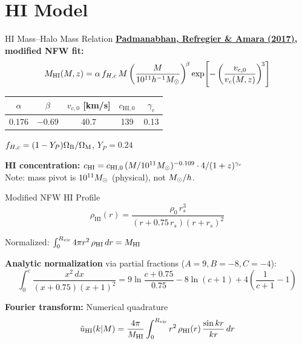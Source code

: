 \section{HI Model}

\begin{frame}{HI Mass--Halo Mass Relation}
\textbf{\href{https://arxiv.org/abs/1611.06235}{Padmanabhan, Refregier \& Amara (2017)}, modified NFW fit:}
\begin{equation}
M_{\mathrm{HI}}(M,z) = \alpha\,f_{H,c}\,M\left(\frac{M}{10^{11}h^{-1}M_\odot}\right)^{\!\beta}\exp\!\left[-\left(\frac{v_{c,0}}{v_c(M,z)}\right)^{\!3}\right]
\end{equation}

\begin{table}\centering\footnotesize
\begin{tabular}{ccccc}
\toprule
$\alpha$ & $\beta$ & $v_{c,0}$ [km/s] & $c_{\mathrm{HI},0}$ & $\gamma_c$ \\
\midrule
0.176 & $-0.69$ & 40.7 & 139 & 0.13 \\
\bottomrule
\end{tabular}
\end{table}

$f_{H,c} = (1-Y_P)\Omega_{\mathrm{B}}/\Omega_{\mathrm{M}}$, \quad $Y_P = 0.24$

\vspace{0.2cm}
\textbf{HI concentration:} $c_{\mathrm{HI}} = c_{\mathrm{HI},0}\,(M/10^{11}M_\odot)^{-0.109}\cdot 4/(1+z)^{\gamma_c}$\\[2pt]
Note: mass pivot is $10^{11}M_\odot$ (physical), not $M_\odot/h$.
\end{frame}

\begin{frame}{Modified NFW HI Profile}
\begin{equation}
\rho_{\mathrm{HI}}(r) = \frac{\rho_0\,r_s^3}{(r + 0.75\,r_s)(r + r_s)^2}
\end{equation}

Normalized: $\int_0^{R_{\mathrm{vir}}} 4\pi r^2\,\rho_{\mathrm{HI}}\,dr = M_{\mathrm{HI}}$

\vspace{0.2cm}
\textbf{Analytic normalization} via partial fractions ($A{=}9, B{=}{-}8, C{=}{-}4$):
\begin{equation}
\int_0^c \frac{x^2\,dx}{(x{+}0.75)(x{+}1)^2} = 9\ln\!\frac{c{+}0.75}{0.75} - 8\ln(c{+}1) + 4\!\left(\frac{1}{c{+}1}-1\right)
\end{equation}

\textbf{Fourier transform:} Numerical quadrature
\begin{equation}
\tilde{u}_{\mathrm{HI}}(k|M) = \frac{4\pi}{M_{\mathrm{HI}}}\int_0^{R_{\mathrm{vir}}} r^2\,\rho_{\mathrm{HI}}(r)\,\frac{\sin kr}{kr}\,dr
\end{equation}
\end{frame}

